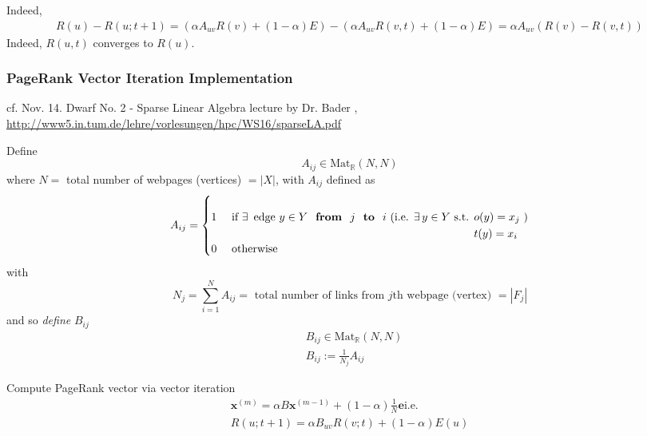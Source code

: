 \documentclass[10pt]{amsart}
\begin{document}
\begin{multicols*}{2}
Indeed, 
\begin{equation}
\begin{gathered}
R(u) - R(u;t+1) = (\alpha A_{uv} R(v) + (1-\alpha) E) - ( \alpha A_{uv} R(v,t) + (1-\alpha ) E) = \alpha A_{uv}(R(v) - R(v,t) )
\end{gathered}
\end{equation}
Indeed, $R(u,t)$ converges to $R(u)$.  

\subsubsection{PageRank Vector Iteration Implementation \cite{TUMHPC2016}}

cf. Nov. 14. Dwarf No. 2 - Sparse Linear Algebra lecture by Dr. Bader \cite{TUMHPC2016}, \url{http://www5.in.tum.de/lehre/vorlesungen/hpc/WS16/sparseLA.pdf}  

Define 
\begin{equation}
	A_{ij} \in \text{Mat}_{\mathbb{R}}(N,N) 
\end{equation}
where $N=$ total number of webpages (vertices) $= |X|$, with $A_{ij}$ defined as 
\begin{equation} 
A_{ij} = \begin{cases} 
1 & \text{ if $ \exists \, $ edge $ y \in Y$ \textbf{ from } $j$ \textbf{ to } $i$ (i.e. $\exists \, y \in Y$ s.t. $\begin{aligned} & \quad \\ & o(y) = x_j \\ & t(y) = x_i \end{aligned}$ } ) \\
0 & \text{ otherwise } \end{cases}   
\end{equation}
with 
\begin{equation}
N_j = \sum_{i=1}^N A_{ij} = \text{ total number of links from $j$th webpage (vertex) } = |F_j |
\end{equation}
and so \emph{define} $B_{ij}$
\begin{equation}
\begin{aligned}
	& B_{ij} \in \text{Mat}_{\mathbb{R}}(N,N) \\ 
	& B_{ij} := \frac{1}{N_j} A_{ij}
\end{aligned}
\end{equation}

Compute PageRank vector via vector iteration 
\begin{equation}
\begin{gathered} 
\mathbf{x}^{(m)} = \alpha B \mathbf{x}^{(m-1)} + (1-\alpha) \frac{1}{N} \mathbf{e} \text{i.e. }  \\
R(u;t+1) = \alpha B_{uv} R(v;t) + (1-\alpha ) E(u)
\end{gathered}
\end{equation}


\end{multicols*}
\end{document}
